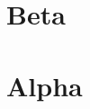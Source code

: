 \documentclass[]{politex}
\begin{document}
\blindtext

\begin{citacaoLonga}
	\blindtext
\end{citacaoLonga}

\blindtext



\blinddocument


%

%

%


\apendice
\chapter{}
\chapter{Beta}


\anexo
\chapter{Alpha}
\chapter{}
\end{document}
